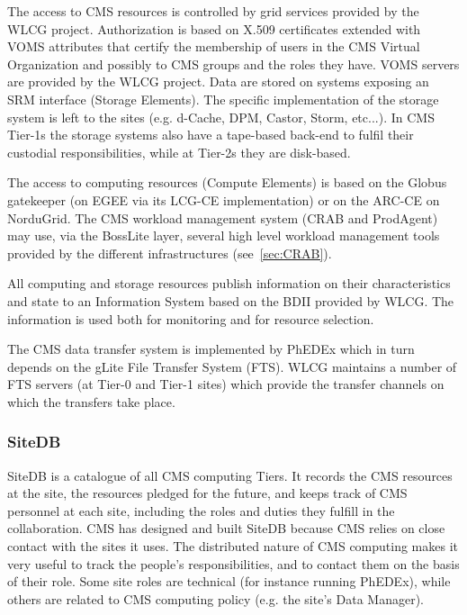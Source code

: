 The access to CMS resources is controlled by grid services provided by the WLCG project.
Authorization is based on X.509 certificates extended with VOMS attributes
that certify the membership of users in the CMS Virtual Organization and possibly 
to CMS groups and the roles they have.
VOMS servers are provided by the WLCG project.
Data are stored on systems exposing an SRM interface (Storage Elements).
The specific implementation of the storage system is left to the sites
(e.g. d-Cache, DPM, Castor, Storm, etc...). In CMS Tier-1s the storage
systems also have a tape-based back-end to fulfil their custodial
responsibilities, while at Tier-2s they are disk-based.

The access to computing resources (Compute Elements) is based on
the Globus gatekeeper (on EGEE via its LCG-CE implementation) or on the ARC-CE on NorduGrid.
The CMS workload management system (CRAB and ProdAgent) may use, via the BossLite layer,
several high level workload management tools provided by the different infrastructures
(see~\ref{sec:CRAB}).


All computing and storage resources publish information on their
characteristics and state to an Information System based
on the BDII provided by WLCG. The information is used both
for monitoring and for resource selection.

The CMS data transfer system is implemented by PhEDEx which
in turn depends on the gLite File Transfer System (FTS).
WLCG maintains a number of FTS servers (at Tier-0 and Tier-1 sites)
which provide the transfer channels on which the transfers take place.


\subsubsection{ SiteDB }
\label{sec:4_1_2}
SiteDB is a catalogue of all CMS computing Tiers.
It records the CMS resources at the site, the resources pledged for the future,
and keeps track of CMS personnel at each site, including the roles
and duties they fulfill in the collaboration.
CMS has designed and built SiteDB because CMS relies on close contact
with the sites it uses. The distributed nature of CMS computing makes
it very useful to track the people's responsibilities, and to contact
them on the basis of their role. Some site roles are technical
 (for instance running PhEDEx), while others are related to CMS computing
 policy (e.g. the site's Data Manager).

